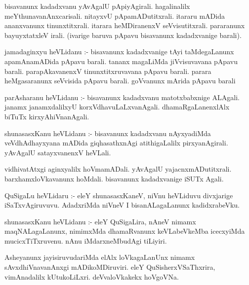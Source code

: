 \documentclass{article}
\begin{document}
\begin{mn}
bisavanunx  kadadxvanu  yAvAgalU  pApiyAgirali.  hagalinalilx  meYthunavanAnxcarisali.  
nitayxvU  pApamADutitxrali.  itararu  mADida  ananxvanunx  tinunxtitxrali.  itarara  
heMDiranenxV  seVvisutitxrali.  pararanunx  bayuyxtatxleV  irali. (ivarige  baruva  
pApavu  bisavanunx  kadadxvanige  barali).
\end{mn}

\begin{mn}
jamadaginxyu  heVLidanu :- bisavanunx  kadadxvanige  tAyi taMdegaLanunx  apamAnamADida  
pApavu  barali.  tananx  magaLiMda  jiVvisuvavana  pApavu  barali.  parapAkavanenxV  
tinunxtitxruvavana  pApavu  barali.  parara  heMgasaranunx  seVvisida  pApavu  barali.  
goVvanunx  mArida  pApavu  barali
\end{mn}

\begin{mn}
parAsharanu  heVLidanu :-  bisavanunx  kadadxvanu  matotxbabxnige  ALAgali.  janamx 
janamxdalilxyU  korxVdhavuLaLxvanAgali.  dhamaRgaLanenxlAlx  biTuTx  kirxyAhiVnanAgali.
\end{mn}

\begin{mn}
 shunasasxKanu  heVLidanu :- bisavanunx  kadadxvanu  nAyxyadiMda  veVdhAdhayxyana  
 mADida  giqhasathxnAgi  atithigaLalilx  pirxyanAgirali.  yAvAgalU  satayxvanenxV  heVLali.
\end{mn}

\begin{mn}
vidhivatAtxgi  aginxyalilx  hoVmamADali.  yAvAgalU  yajacnxmADutitxrali.  
barxhamxloVkavanunx  hoMdali.  bisavanunx  kadadxvanige  iSUTx  Agali.
\end{mn}

\begin{mn}
QuSigaLu  heVLidaru :-  eleY  shunasasxKaneV,  niVnu  heVLiduvu  divxjarige  
iSaTxvAgiruvuvu.  AdadxriMda  niVneV  I  bisanALagaLanunx  kadidxrabeVku.
\end{mn}

\begin{mn}
shunasasxKanu  heVLidanu :- eleY  QuSigaLira,  nAneV  nimamx  maqNALagaLanunx,  nimimxMda  
dhamaRvanunx  keVLabeVkeMba  icecxyiMda  mucicxTiTxruvenu.  nAnu  iMdarxneMbudAgi  tiLiyiri.
\end{mn}

\begin{mn}
Asheyanunx  jayisiruvudariMda  elAlx  loVkagaLanUnx  nimamx  sAvxdhiVnavanAnxgi  mADikoMDiruviri.  
eleY  QuSisherxVSaThxrira,  vimAnadalilx  kUtukoLiLxri.  deVvaloVkakekx  hoVgoVNa.
\end{mn}
\end{document}
